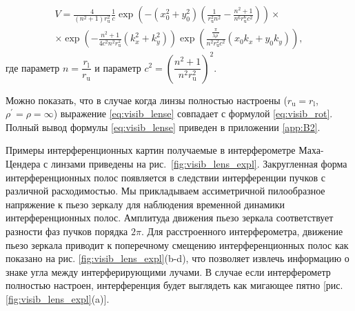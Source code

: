 \begin{equation}
\begin{split}
    V =\frac{4}{\left(n^{2}+1\right) r_{\mathrm{u}}^{2}} \frac{1}{c} \exp \left(-\left(x_{0}^{2}+y_{0}^{2}\right)\left(\frac{1}{r_{\mathrm{u}}^{2} n^{2}}-\frac{n^{2}+1}{n^{6} r_{\mathrm{u}}^{6} c^{2}}\right)\right) \times \\ \times \exp \left(-\frac{n^{2}+1}{4 c^{2} n^{2} r_{\mathrm{u}}^{2}}\left(k_{x}^{2}+k_{y}^{2}\right)\right) \exp \left(\frac{\frac{\pi}{\lambda \rho^{\prime}}}{n^{2} r_{\mathrm{u}}^{2} c^{2}}\left(x_{0} k_{x}+y_{0} k_{y}\right)\right),
\end{split}
\label{eq:visib_lense}
\end{equation}
где параметр $n=\dfrac{r_{\mathrm{l}}}{r_{\mathrm{u}}}$ и параметр $c^2 = (\dfrac{n^2 + 1}{n^2r^2_{\mathrm{u}}})^2$.

Можно показать, что в случае когда линзы полностью настроены ($r_{\mathrm{u}} = r_{\mathrm{l}}$, $\rho^{\prime} = \rho = \infty$) выражение \eqref{eq:visib_lense} совпадает с формулой \eqref{eq:visib_rot}. Полный вывод формулы \eqref{eq:visib_lense} приведен в приложении \ref{app:B2}.

Примеры интерференционных картин получаемые в интерферометре Маха-Цендера с линзами приведены на рис.~\ref{fig:visib_lens_expl}. Закругленная форма интерференционных полос появляется в следствии интерференции пучков с различной расходимостью. Мы прикладываем ассиметричной пилообразное напряжение к пьезо зеркалу для наблюдения временной динамики интерференционных полос. Амплитуда движения пьезо зеркала соответствует разности фаз пучков порядка $2\pi$. Для расстроенного интерферометра, движение пьезо зеркала приводит к поперечному смещению интерференционных полос как показано на рис. \ref{fig:visib_lens_expl}(b-d), что позволяет извлечь информацию о знаке угла между интерферирующими лучами. В случае если интерферометр полностью настроен, интерференция будет выглядеть как мигающее пятно [рис. \ref{fig:visib_lens_expl}(a)].

